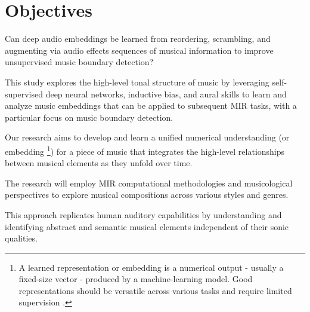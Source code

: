 \section{Objectives}

Can deep audio embeddings be learned from reordering, scrambling, and augmenting via audio effects sequences of musical information to improve unsupervised music boundary detection?

This study explores the high-level tonal structure of music by leveraging self-supervised deep neural networks, inductive bias, and aural skills to learn and analyze music embeddings that can be applied to subsequent MIR tasks, with a particular focus on music boundary detection.

Our research aims to develop and learn a unified numerical understanding (or embedding \footnote{A learned representation or embedding is a numerical output - usually a fixed-size vector - produced by a machine-learning model. Good representations should be versatile across various tasks and require limited supervision \cite{Turian2022HEAR:Representations}.}) for a piece of music that integrates the high-level relationships between musical elements as they unfold over time.

The research will employ MIR computational methodologies and musicological perspectives to explore musical compositions across various styles and genres.

This approach replicates human auditory capabilities by understanding and identifying abstract and semantic musical elements independent of their sonic qualities.